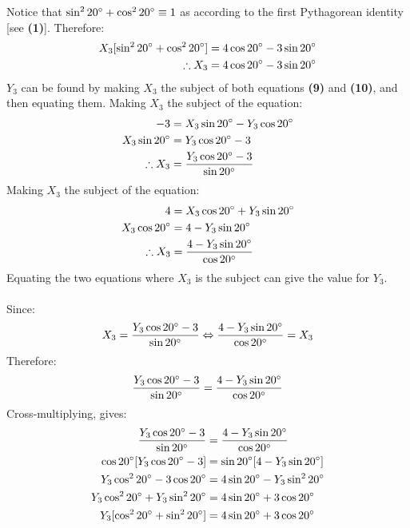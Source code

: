 \documentclass{article}
\begin{document}
            Notice that $\sin^2{20\degree} + \cos^2{20\degree} \equiv 1$ as according to the first Pythagorean identity [see \textbf{(1)}]. Therefore:
            \begin{align*}
                X_3[\sin^2{20\degree} + \cos^2{20\degree}] &= 4\cos{20\degree} - 3\sin{20\degree} \\
                \therefore X_3 &= 4\cos{20\degree} - 3\sin{20\degree}
            \end{align*}
            $Y_3$ can be found by making $X_3$ the subject of both equations \textbf{(9)} and \textbf{(10)}, and then equating them.
            Making $X_3$ the subject of the equation:
            \begin{align*}
            -3 &= X_3\sin{20\degree} - Y_3\cos{20\degree} \\
            X_3\sin{20\degree} &= Y_3\cos{20\degree} - 3 \\
            \therefore X_3 &= \frac{Y_3\cos{20\degree} - 3}{\sin{20\degree}}
            \end{align*}
            Making $X_3$ the subject of the equation:
            \begin{align*}
            4 &= X_3\cos{20\degree} + Y_3\sin{20\degree} \\
            X_3\cos{20\degree} &= 4 - Y_3\sin{20\degree} \\
            \therefore X_3 &= \frac{4 - Y_3\sin{20\degree}}{\cos{20\degree}}
            \end{align*}
            Equating the two equations where $X_3$ is the subject can give the value for $Y_3$. \\\\ 
            Since:
            \begin{equation*}
                X_3 = \frac{Y_3\cos{20\degree} - 3}{\sin{20\degree}} \Leftrightarrow \frac{4 - Y_3\sin{20\degree}}{\cos{20\degree}} = X_3
            \end{equation*}
            Therefore:
            \begin{equation*}
               \frac{Y_3\cos{20\degree} - 3}{\sin{20\degree}} = \frac{4 - Y_3\sin{20\degree}}{\cos{20\degree}}
            \end{equation*}
            Cross-multiplying, gives:
            \begin{align*}
                \frac{Y_3\cos{20\degree} - 3}{\sin{20\degree}} &= \frac{4 - Y_3\sin{20\degree}}{\cos{20\degree}} \\
                \cos{20\degree}[Y_3\cos{20\degree} - 3] &= \sin{20\degree}[4 - Y_3\sin{20\degree}] \\
                Y_3\cos^2{20\degree} - 3\cos{20\degree} &= 4\sin{20\degree} - Y_3\sin^2{20\degree} \\
                Y_3\cos^2{20\degree} + Y_3\sin^2{20\degree} &= 4\sin{20\degree} + 3\cos{20\degree} \\
                Y_3[\cos^2{20\degree} + \sin^2{20\degree}] &= 4\sin{20\degree} + 3\cos{20\degree}
            \end{align*}
\end{document}
